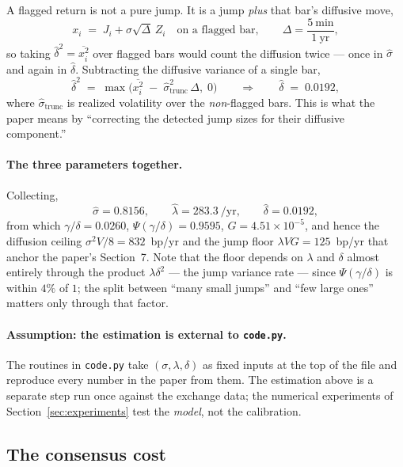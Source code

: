 \documentclass[11pt]{article}
\theoremstyle{definition}
\theoremstyle{remark}
\newcommand{\1}{\mathbf{1}}
\begin{document}
A flagged return is not a pure jump. It is a jump \emph{plus} that bar's diffusive move,
\[
x_i \;=\; J_i + \sigma\sqrt{\Delta}\,Z_i \quad\text{on a flagged bar},
\qquad \Delta = \frac{5\ \text{min}}{1\ \text{yr}},
\]
so taking $\hat\delta^2 = \overline{x_i^2}$ over flagged bars would count the diffusion twice --- once in $\hat\sigma$ and again in $\hat\delta$. Subtracting the diffusive variance of a single bar,
\begin{equation}\label{eq:deltahat}
\hat\delta^2 \;=\; \max\Big(\overline{x_i^2} \;-\; \hat\sigma_{\mathrm{trunc}}^2\,\Delta,\; 0\Big)
\qquad\Longrightarrow\qquad
\hat\delta \;=\; \mathbf{0.0192},
\end{equation}
where $\hat\sigma_{\mathrm{trunc}}$ is realized volatility over the \emph{non}-flagged bars. This is what the paper means by ``correcting the detected jump sizes for their diffusive component.''

\paragraph{The three parameters together.} Collecting,
\[
\hat\sigma = 0.8156, \qquad \hat\lambda = 283.3\ \text{/yr}, \qquad \hat\delta = 0.0192,
\]
from which $\gamma/\delta = 0.0260$, $\Psi(\gamma/\delta) = 0.9595$, $G = 4.51\times10^{-5}$, and hence the diffusion ceiling $\sigma^2V/8 = 832$~bp/yr and the jump floor $\lambda VG = 125$~bp/yr that anchor the paper's Section~7. Note that the floor depends on $\lambda$ and $\delta$ almost entirely through the product $\lambda\delta^2$ --- the jump variance rate --- since $\Psi(\gamma/\delta)$ is within $4\%$ of $1$; the split between ``many small jumps'' and ``few large ones'' matters only through that factor.

\paragraph{Assumption: the estimation is external to \texttt{code.py}.} The routines in \texttt{code.py} take $(\sigma,\lambda,\delta)$ as fixed inputs at the top of the file and reproduce every number in the paper from them. The estimation above is a separate step run once against the exchange data; the numerical experiments of Section~\ref{sec:experiments} test the \emph{model}, not the calibration.

\subsection{The consensus cost}
\end{document}
